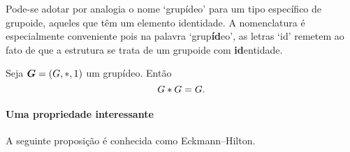 Pode-se adotar por analogia o nome `grupídeo' para um tipo específico de grupoide, aqueles que têm um elemento identidade. A nomenclatura é especialmente conveniente pois na palavra `grup\textbf{íd}eo', as letras `id' remetem ao fato de que a estrutura se trata de um grupoide com \textbf{id}entidade.

\begin{exercise}
Seja $\bm G=(G,\ast,1)$ um grupídeo. Então
	\begin{equation*}
	G \ast G = G.
	\end{equation*}
\end{exercise}

\paragraph{Uma propriedade interessante}

A seguinte proposição é conhecida como Eckmann–Hilton.

